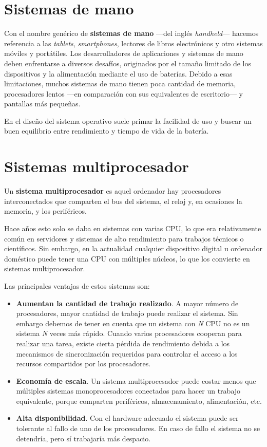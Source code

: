\section{Sistemas de mano}\label{_sistemas_de_mano}

{} {} Con el nombre genérico de \textbf{sistemas de mano} ---del inglés
\emph{handheld}--- hacemos referencia a las \emph{tablets},
\emph{smartphones}, lectores de libros electrónicos y otro sistemas
móviles y portátiles. Los desarrolladores de aplicaciones y sistemas de
mano deben enfrentarse a diversos desafíos, originados por el tamaño
limitado de los dispositivos y la alimentación mediante el uso de
baterías. Debido a esas limitaciones, muchos sistemas de mano tienen
poca cantidad de memoria, procesadores lentos ---en comparación con sus
equivalentes de escritorio--- y pantallas más pequeñas.

En el diseño del sistema operativo suele primar la facilidad de uso y
buscar un buen equilibrio entre rendimiento y tiempo de vida de la
batería.

\section{Sistemas multiprocesador}\label{_sistemas_multiprocesador}

{} Un \textbf{sistema multiprocesador} es aquel ordenador hay
procesadores interconectados que comparten el bus del sistema, el reloj
y, en ocasiones la memoria, y los periféricos.

Hace años esto solo se daba en sistemas con varias CPU, lo que era
relativamente común en servidores y sistemas de alto rendimiento para
trabajos técnicos o científicos. Sin embargo, en la actualidad cualquier
dispositivo digital u ordenador doméstico puede tener una CPU con
múltiples núcleos, lo que los convierte en sistemas multiprocesador.

Las principales ventajas de estos sistemas son:

\begin{itemize}
\item
  \textbf{Aumentan la cantidad de trabajo realizado}. A mayor número de
  procesadores, mayor cantidad de trabajo puede realizar el sistema. Sin
  embargo debemos de tener en cuenta que un sistema con \emph{N} CPU no
  es un sistema \emph{N} veces más rápido. Cuando varios procesadores
  cooperan para realizar una tarea, existe cierta pérdida de rendimiento
  debida a los mecanismos de sincronización requeridos para controlar el
  acceso a los recursos compartidos por los procesadores.
\item
  \textbf{Economía de escala}. Un sistema multiprocesador puede costar
  menos que múltiples sistemas monoprocesadores conectados para hacer un
  trabajo equivalente, porque comparten periféricos, almacenamiento,
  alimentación, etc.
\item
  \textbf{Alta disponibilidad}. Con el hardware adecuado el sistema
  puede ser tolerante al fallo de uno de los procesadores. En caso de
  fallo el sistema no se detendría, pero sí trabajaría más despacio.
\end{itemize}

